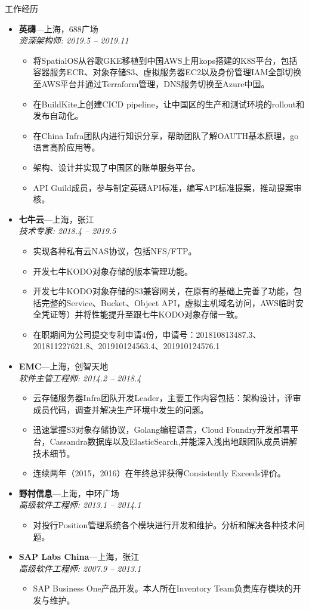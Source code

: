 \documentclass[11pt,oneside]{article}
\newenvironment{ressection}[1]{
	\vspace{4pt}
	{\selectfont\Large#1}
	\begin{itemize}
	\vspace{3pt}
}{
	\end{itemize}
}
\newcommand{\ressubitem}[1]{
	\vspace{-1pt}
	\item \begin{flushleft} #1 \end{flushleft}
}
\newcommand{\resbigitem}[3]{
	\vspace{-5pt}
	\item
	\textbf{#1}---#2 \\
	\textit{#3}
}
\newenvironment{ressubsec}[3]{
	\resbigitem{#1}{#2}{#3}
	\vspace{-2pt}
	\begin{itemize}
}{
    \end{itemize}
}
\begin{document}
\begin{ressection}{工作经历}

	\begin{ressubsec}{英礴}{上海，688广场}{资深架构师: 2019.5 -- 2019.11}
		\ressubitem{将SpatialOS从谷歌GKE移植到中国AWS上用kops搭建的K8S平台，包括容器服务ECR、对象存储S3、虚拟服务器EC2以及身份管理IAM全部切换至AWS平台并通过Terraform管理，DNS服务切换至Azure中国。}
		\ressubitem{在BuildKite上创建CICD pipeline，让中国区的生产和测试环境的rollout和发布自动化。}
		\ressubitem{在China Infra团队内进行知识分享，帮助团队了解OAUTH基本原理，go语言高阶应用等。}
		\ressubitem{架构、设计并实现了中国区的账单服务平台。}
		\ressubitem{API Guild成员，参与制定英礴API标准，编写API标准提案，推动提案审核。}
	\end{ressubsec}

	\begin{ressubsec}{七牛云}{上海，张江}{技术专家: 2018.4 -- 2019.5}
		\ressubitem{实现各种私有云NAS协议，包括NFS/FTP。}
		\ressubitem{开发七牛KODO对象存储的版本管理功能。}
		\ressubitem{开发七牛KODO对象存储的S3兼容网关，在原有的基础上完善了功能，包括完整的Service、Bucket、Object API，虚拟主机域名访问，AWS临时安全凭证等）并将性能提升至跟七牛KODO对象存储一致。}
		\ressubitem{在职期间为公司提交专利申请4份，申请号：201810813487.3、201811227621.8、201910124563.4、201910124576.1}
	\end{ressubsec}

	\begin{ressubsec}{EMC}{上海，创智天地}{软件主管工程师: 2014.2 -- 2018.4}
		\ressubitem{云存储服务器Infra团队开发Leader，主要工作内容包括：架构设计，评审成员代码，调查并解决生产环境中发生的问题。}
		\ressubitem{迅速掌握S3对象存储协议，Golang编程语言，Cloud Foundry开发部署平台，Cassandra数据库以及ElasticSearch,并能深入浅出地跟团队成员讲解技术细节。}
		\ressubitem{连续两年（2015，2016）在年终总评获得Consistently Exceeds评价。}
	\end{ressubsec}

	\begin{ressubsec}{野村信息}{上海，中环广场}{高级软件工程师: 2013.1 -- 2014.1}
		\ressubitem{对投行Position管理系统各个模块进行开发和维护。分析和解决各种技术问题。}
	\end{ressubsec}

	\begin{ressubsec}{SAP Labs China}{上海，张江}{高级软件工程师: 2007.9 -- 2013.1}
		\ressubitem{SAP Business One产品开发。本人所在Inventory Team负责库存模块的开发与维护。}
	\end{ressubsec}


\end{ressection}
\end{document}
